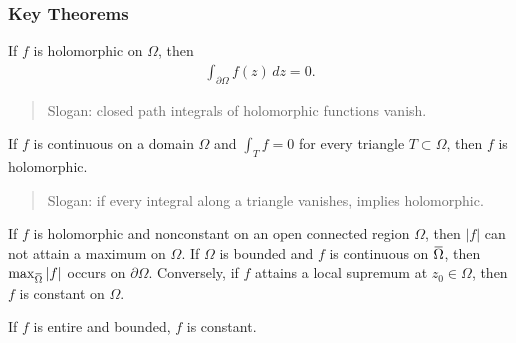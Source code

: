 \hypertarget{key-theorems}{%
\subsubsection{Key Theorems}\label{key-theorems}}

\begin{theorem}\label{CauchyTheorem}

If \(f\) is holomorphic on \(\Omega\), then
\begin{align*}  
\int_{{{\partial}}\Omega} f(z) \, dz = 0
.\end{align*}

\begin{quote}
Slogan: closed path integrals of holomorphic functions vanish.
\end{quote}

\end{theorem}

\begin{theorem}\label{Morera}

If \(f\) is continuous on a domain \(\Omega\) and \(\int_T f = 0\) for
every triangle \(T\subset \Omega\), then \(f\) is holomorphic.

\begin{quote}
Slogan: if every integral along a triangle vanishes, implies
holomorphic.
\end{quote}

\end{theorem}

\begin{theorem}\label{MaximumModulus}

If \(f\) is holomorphic and nonconstant on an open connected region
\(\Omega\), then \({\left\lvert {f} \right\rvert}\) can not attain a
maximum on \(\Omega\). If \(\Omega\) is bounded and \(f\) is continuous
on
\(\mkern 1.5mu\overline{\mkern-1.5mu\Omega\mkern-1.5mu}\mkern 1.5mu\),
then
\(\max_{\mkern 1.5mu\overline{\mkern-1.5mu\Omega\mkern-1.5mu}\mkern 1.5mu} {\left\lvert {f} \right\rvert}\)
occurs on \({{\partial}}\Omega\). Conversely, if \(f\) attains a local
supremum at \(z_0 \in \Omega\), then \(f\) is constant on \(\Omega\).

\end{theorem}

\begin{theorem}\label{Liouville}

If \(f\) is entire and bounded, \(f\) is constant.

\end{theorem}

